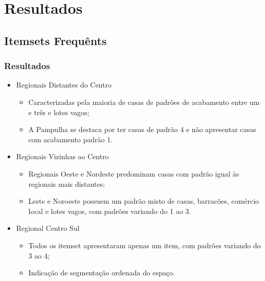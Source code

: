\section{Resultados}

\subsection{Itemsets Frequênts}
\begin{frame}

    \frametitle{Resultados}

    \begin{itemize}
    
        \item Regionais Distantes do Centro
            \begin{itemize}
                \item Caracterizadas pela maioria de casas de padrões de acabamento entre um e três e lotes vagos;
                \item A Pampulha se destaca por ter casas de padrão 4 e não apresentar casas com acabamento padrão 1.
            \end{itemize}
            
        \item Regionais Vizinhas ao Centro
            \begin{itemize}
                \item Regionais Oeste e Nordeste predominam casas com padrão igual às regionais mais distantes;
                \item Leste e Noroeste possuem um padrão misto de casas, barracões, comércio local e lotes vagos, com padrões variando do 1 ao 3.
            \end{itemize}
        \item Regional Centro Sul
            \begin{itemize}
                \item Todos os itemset apresentaram apenas um item, com padrões variando do 3 ao 4;
                \item Indicação de segmentação ordenada do espaço.
            \end{itemize}
            
    \end{itemize}

\end{frame}

